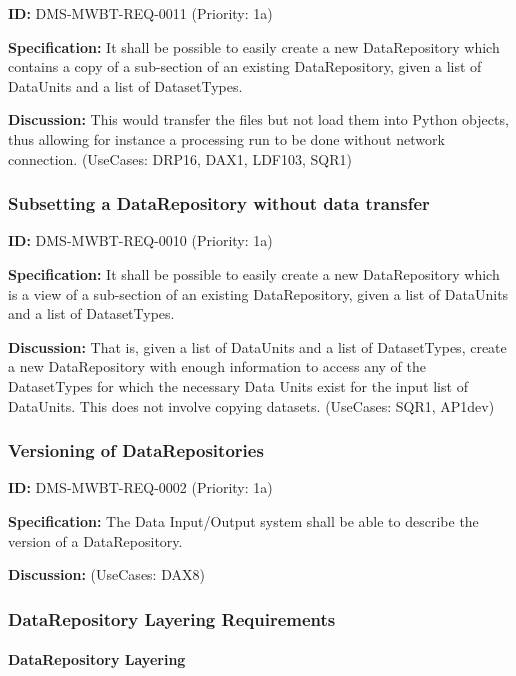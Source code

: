 \documentclass[SE,toc,lsstdraft]{lsstdoc}
\begin{document}
\label{DMS-MWBT-REQ-0011}
\textbf{ID:} DMS-MWBT-REQ-0011 (Priority: 1a)

\textbf{Specification:}
It shall be possible to easily create a new DataRepository which contains a copy of a sub-section of an existing DataRepository, given a list of DataUnits and a list of DatasetTypes.

\textbf{Discussion:}
This would transfer the files but not load them into Python objects, thus allowing for instance a processing run to be done without network connection. (UseCases: DRP16, DAX1, LDF103, SQR1)

\subsubsection{Subsetting a DataRepository without data transfer}

\label{DMS-MWBT-REQ-0010}
\textbf{ID:} DMS-MWBT-REQ-0010 (Priority: 1a)

\textbf{Specification:}
It shall be possible to easily create a new DataRepository which is a view of a sub-section of an existing DataRepository, given a list of DataUnits and a list of DatasetTypes.

\textbf{Discussion:}
That is, given a list of DataUnits and a list of DatasetTypes, create a new DataRepository with enough information to access any of the DatasetTypes for which the necessary Data Units exist for the input list of DataUnits. This does not involve copying datasets. (UseCases: SQR1, AP1dev)

\subsubsection{Versioning of DataRepositories}

\label{DMS-MWBT-REQ-0002}
\textbf{ID:} DMS-MWBT-REQ-0002 (Priority: 1a)

\textbf{Specification:}
The Data Input/Output system shall be able to describe the version of a DataRepository.

\textbf{Discussion:}
(UseCases: DAX8)

\subsubsection{DataRepository Layering Requirements}

\paragraph{DataRepository Layering}\hfill  %
\end{document}
